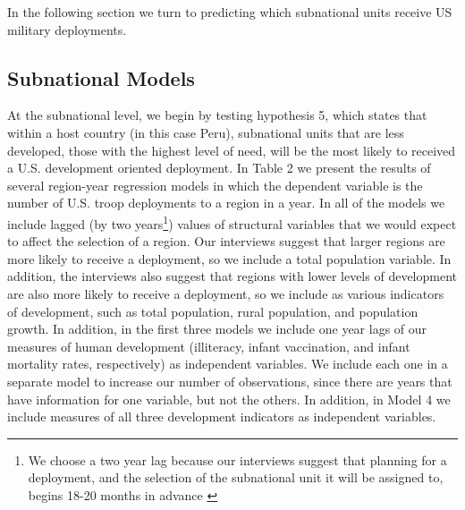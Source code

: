 \documentclass[12pt]{article}
\begin{document}
\begin{doublespace}
In the following section we turn to predicting which subnational units receive US military deployments.



\subsection{Subnational Models}

At the subnational level, we begin by testing hypothesis 5, which states that within a host country (in this case Peru), subnational units that are less developed, those with the highest level of need, will be the most likely to received a U.S. development oriented deployment.  In Table 2 we present the results of several region-year regression models in which the dependent variable is the number of U.S. troop deployments to a region in a year. In all of the models we include lagged (by two years\footnote{We choose a two year lag because our interviews suggest that planning for a deployment, and the selection of the subnational unit it will be assigned to, begins 18-20 months in advance \cite{CPT20160309}}) values of structural variables that we would expect to affect the selection of a region.  Our interviews suggest that larger regions are more likely to receive a deployment, so we include a total population variable.  In addition, the interviews also suggest that regions with lower levels of development are also more likely to receive a deployment, so we include as various indicators of development, such as total population, rural population, and population growth. In addition, in the first three models we include one year lags of our measures of human development (illiteracy, infant vaccination, and infant mortality rates, respectively) as independent variables.  We include each one in a separate model to increase our number of observations, since there are years that have information for one variable, but not the others. In addition, in Model 4 we include measures of all three development indicators as independent variables. 


\end{doublespace}
\end{document}
